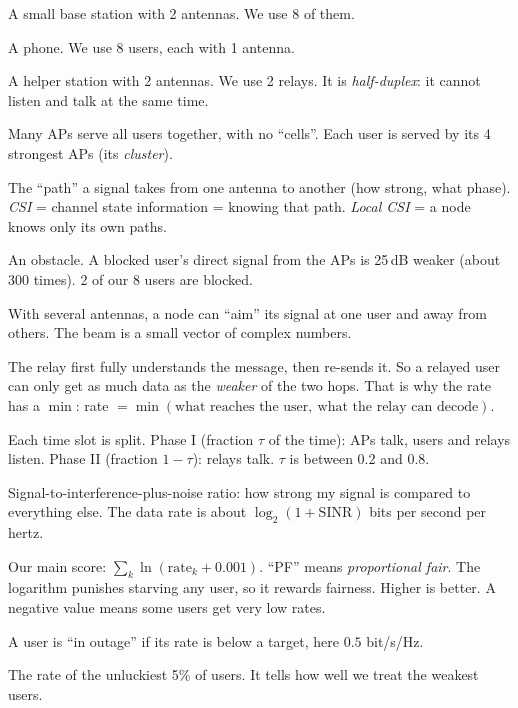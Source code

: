 \documentclass[11pt,a4paper]{article}
\begin{document}
\begin{description}[style=nextline,leftmargin=1.2em]
\item[AP (access point)] A small base station with 2 antennas. We use 8 of them.
\item[UE (user equipment)] A phone. We use 8 users, each with 1 antenna.
\item[Relay] A helper station with 2 antennas. We use 2 relays. It is \emph{half-duplex}: it cannot listen and
  talk at the same time.
\item[Cell-free massive MIMO] Many APs serve all users together, with no ``cells''. Each user is served by its 4
  strongest APs (its \emph{cluster}).
\item[Channel / CSI] The ``path'' a signal takes from one antenna to another (how strong, what phase).
  \emph{CSI} = channel state information = knowing that path. \emph{Local CSI} = a node knows only its own paths.
\item[Blockage] An obstacle. A blocked user's direct signal from the APs is 25\,dB weaker (about 300 times).
  2 of our 8 users are blocked.
\item[Beam / beamforming] With several antennas, a node can ``aim'' its signal at one user and away from others.
  The beam is a small vector of complex numbers.
\item[Decode-and-forward (DF)] The relay first fully understands the message, then re-sends it. So a relayed
  user can only get as much data as the \emph{weaker} of the two hops. That is why the rate has a $\min$:
  rate $=\min(\text{what reaches the user},\ \text{what the relay can decode})$.
\item[Two phases and $\tau$] Each time slot is split. Phase I (fraction $\tau$ of the time): APs talk, users and
  relays listen. Phase II (fraction $1-\tau$): relays talk. $\tau$ is between 0.2 and 0.8.
\item[SINR] Signal-to-interference-plus-noise ratio: how strong my signal is compared to everything else.
  The data rate is about $\log_2(1+\text{SINR})$ bits per second per hertz.
\item[PF utility] Our main score: $\sum_k \ln(\text{rate}_k + 0.001)$. ``PF'' means \emph{proportional fair}.
  The logarithm punishes starving any user, so it rewards fairness. Higher is better. A negative value means
  some users get very low rates.
\item[Outage] A user is ``in outage'' if its rate is below a target, here $0.5$ bit/s/Hz.
\item[5th-percentile rate] The rate of the unluckiest 5\% of users. It tells how well we treat the weakest users.

\end{description}
\end{document}
